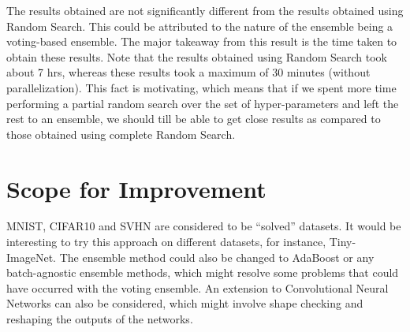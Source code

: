 \documentclass[12pt]{article}
\begin{document}
\begin{flushleft}
The results obtained are not significantly different from the results obtained using Random Search. This could be attributed to the nature of the ensemble being a voting-based ensemble. The major takeaway from this result is the time taken to obtain these results. Note that the results obtained using Random Search took about 7 hrs, whereas these results took a maximum of 30 minutes (without parallelization). This fact is motivating, which means that if we spent more time performing a partial random search over the set of hyper-parameters and left the rest to an ensemble, we should till be able to get close results as compared to those obtained using complete Random Search.
\end{flushleft}

\section{Scope for Improvement}
MNIST, CIFAR10 and SVHN are considered to be ``solved'' datasets. It would be interesting to try this approach on different datasets, for instance, Tiny-ImageNet. The ensemble method could also be changed to AdaBoost or any batch-agnostic ensemble methods, which might resolve some problems that could have occurred with the voting ensemble. An extension to Convolutional Neural Networks can also be considered, which might involve shape checking and reshaping the outputs of the networks.

\end{document}
